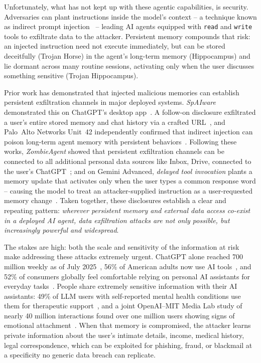 \documentclass[sigconf]{acmart}
\begin{document}
Unfortunately, what has not kept up with these agentic capabilities, is security.
Adversaries can plant instructions inside the model's context -- a technique
known as indirect prompt injection~\citep{greshake2023not} -- leading AI agents equipped with \texttt{read} 
and \texttt{write} tools to exfiltrate data to the attacker.
Persistent memory compounds that risk: an injected instruction need not execute immediately, 
but can be stored deceitfully (Trojan Horse) in the agent's long-term memory (Hippocampus) and lie dormant across many routine sessions, 
activating only when the user discusses something sensitive (Trojan Hippocampus).


Prior work has demonstrated that injected malicious memories can establish persistent exfiltration channels in major deployed systems. 
\emph{SpAIware} demonstrated this on ChatGPT's
desktop app~\citep{rehberger2024spaiware,morsy2025spaiware}. A follow-on disclosure
exfiltrated a user's entire stored memory and chat history via a crafted
URL~\citep{rehberger2025chathistory}, and Palo~Alto Networks Unit~42 independently
confirmed that indirect injection can poison long-term agent memory with persistent
behaviors~\citep{unit42_2025_memory}.
Following these works, \emph{ZombieAgent} showed that persistent exfiltration
channels can be connected to all additional personal data sources like Inbox, Drive, connected to the user's ChatGPT~\citep{radware2026zombieagent}; and on Gemini Advanced, \emph{delayed tool
invocation} plants a memory update that activates only when the user types a common
response word -- causing the model to treat an attacker-supplied instruction as a
user-requested memory change~\citep{rehberger2025gemini,goodin2025gemini}.
Taken together, these disclosures establish a clear and repeating pattern:
\emph{wherever persistent memory and external data access co-exist in a deployed
AI agent, data exfiltration attacks are not only possible, but increasingly powerful
and widespread}.


The stakes are high: both the scale and sensitivity of the information at risk make addressing these attacks extremely urgent.
ChatGPT alone reached 700 million weekly as of July 2025~\citep{openai2024affective}, 
56\% of American adults now use AI tools~\citep{brookings2025aisurvey}, and 52\% of consumers globally feel comfortable
relying on personal AI assistants for everyday tasks~\citep{zendesk2025survey}.
People share extremely sensitive information with their AI assistants: 49\% of LLM users with
self-reported mental health conditions use them for therapeutic support~\citep{rousmaniere2025mentalhealth},
and a joint OpenAI--MIT Media Lab study of nearly 40 million interactions found over
one million users showing signs of emotional attachment~\citep{openai2024affective}.
When that memory is compromised, the attacker learns private information about the user's 
intimate details, income, medical history, legal correspondence, which can be exploited for phishing, fraud, or blackmail at a specificity no
generic data breach can replicate.
\end{document}
